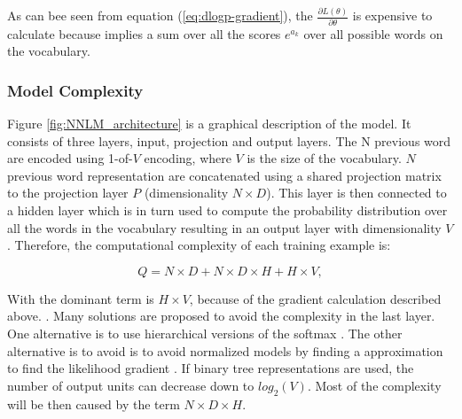 As can bee seen from equation (\ref{eq:dlogp-gradient}), the  $\frac{\partial L(\theta)}{\partial
  \theta}$ is  expensive to calculate because implies a sum over all the scores $e^{a_{k}}$ over all possible words on the vocabulary.


\subsubsection{Model Complexity}
\label{sec:sub:sub:bengio_nnlm_complexity}

Figure \ref{fig:NNLM_architecture} is a graphical description of  the model.
It consists of three layers, input, projection and output layers. The N
previous word are encoded using 1-of-$V$ encoding, where $V$ is the size
of the vocabulary. $N$ previous word representation are concatenated using a
shared projection matrix to the projection layer $P$ (dimensionality $N
\times D$).  This layer is then connected to a hidden layer which is in turn
used to compute the probability distribution over all the words in the
vocabulary resulting in an output layer with dimensionality $V$. Therefore,
the computational complexity of each training example is:

\begin{center}
\begin{equation} Q = N \times D + N \times D \times H + H \times V,   \end{equation}
\end{center}

With the dominant term is $H \times V$, because of the gradient calculation
described above.
\cite{DBLP:journals/corr/abs-1301-3781}. Many solutions are proposed to avoid
the complexity in the last layer. One alternative is to use  hierarchical
versions of the softmax \cite{Morin05hierarchicalprobabilistic,6163930}.
The other alternative is to avoid is to avoid  normalized models by finding
a approximation to find the likelihood gradient \cite{NIPS2013_5165} . If binary tree representations are
used, the number of output units can decrease down to $log_2(V)$. Most
of the complexity will be then caused by the term  $N \times D \times H$.



